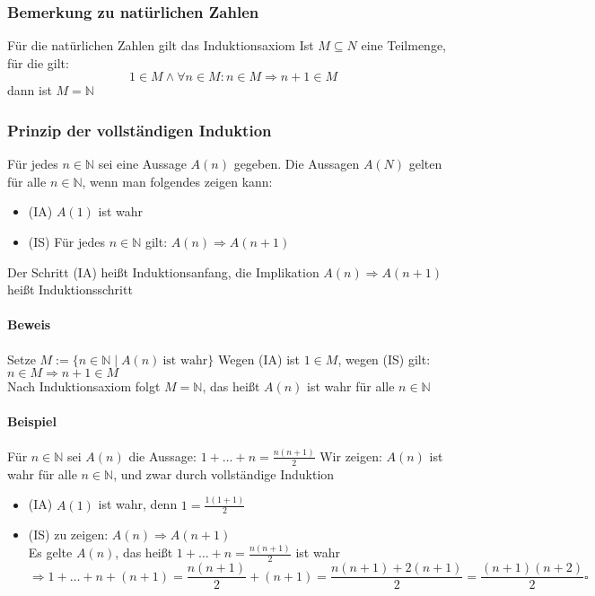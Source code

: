 \documentclass[a4paper]{scrartcl}
\DeclareMathOperator{\Forall}{\forall}
\begin{document}
\subsubsection{Bemerkung zu natürlichen Zahlen}
\label{sec-2-4-14}
Für die natürlichen Zahlen gilt das Induktionsaxiom
Ist $M\subseteq N$ eine Teilmenge, für die gilt:
\[1\in M \wedge \Forall n\in M : n\in M \Rightarrow n+1 \in M\]
dann ist $M = \mathbb{N}$
\subsubsection{Prinzip der vollständigen Induktion}
\label{sec-2-4-15}
Für jedes $n\in \mathbb{N}$ sei eine Aussage $A(n)$ gegeben. Die Aussagen $A(N)$ gelten für alle $n\in\mathbb{N}$, wenn man folgendes zeigen kann: \\
\begin{itemize}
\item (IA) $A(1)$ ist wahr
\item (IS) Für jedes $n\in\mathbb{N}$ gilt: $A(n) \Rightarrow A(n+1)$
\end{itemize}
Der Schritt (IA) heißt Induktionsanfang, die Implikation $A(n) \Rightarrow A(n+1)$ heißt Induktionsschritt
\paragraph{Beweis}
\label{sec-2-4-15-1}
Setze $M := \{n\in \mathbb{N}\mid A(n)~\text{ist wahr}\}$
Wegen (IA) ist $1\in M$, wegen (IS) gilt: $n\in M \Rightarrow n+1 \in M$ \\
     Nach Induktionsaxiom folgt $M = \mathbb{N}$, das heißt $A(n)$ ist wahr für alle $n\in \mathbb{N}$
\paragraph{Beispiel}
\label{sec-2-4-15-2}
Für $n\in\mathbb{N}$ sei $A(n)$ die Aussage: $1+\ldots + n = \frac{n(n+1)}{2}$
Wir zeigen: $A(n)$ ist wahr für alle $n\in \mathbb{N}$, und zwar durch vollständige Induktion
\begin{itemize}
\item (IA) $A(1)$ ist wahr, denn $1 = \frac{1(1+1)}{2}$
\item (IS) zu zeigen: $A(n) \Rightarrow A(n+1)$ \\
       Es gelte $A(n)$, das heißt $1+\ldots+n = \frac{n(n+1)}{2}$ ist wahr \[\Rightarrow 1 + \ldots + n + (n + 1) = \frac{n(n+1)}{2} + (n+1) =  \frac{n(n+1) + 2(n+1)}{2} = \frac{(n+1)(n+2)}{2} \square\]
\end{itemize}
\end{document}
